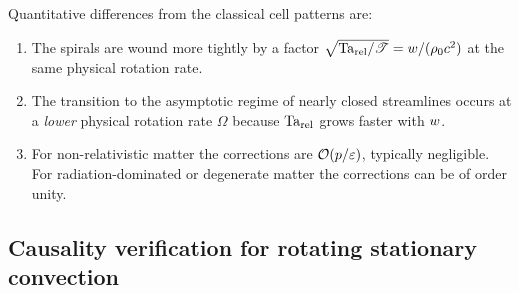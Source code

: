 \begin{relcorrection}
Quantitative differences from the classical cell patterns are:
\begin{enumerate}
  \item The spirals are wound more tightly by a factor
        $\sqrt{\mathrm{Ta}_{\mathrm{rel}}/\mathscr{T}} = w/(\rho_0 c^2)$
        at the same physical rotation rate.
  \item The transition to the asymptotic regime of nearly closed
        streamlines occurs at a \emph{lower} physical rotation rate
        $\Omega$ because $\mathrm{Ta}_{\mathrm{rel}}$ grows faster with $w$.
  \item For non-relativistic matter the corrections are
        $\mathcal{O}(p/\varepsilon)$, typically negligible.  For
        radiation-dominated or degenerate matter the corrections
        can be of order unity.
\end{enumerate}
\end{relcorrection}


\subsection*{Causality verification for rotating stationary convection}

